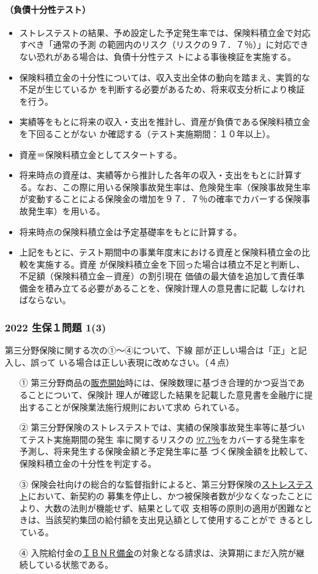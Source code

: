 \documentclass[report,gutter=10mm,fore-edge=10mm,uplatex,dvipdfmx]{jlreq}
\begin{document}
\paragraph{（負債十分性テスト）}
\begin{itemize}
 \item ストレステストの結果、予め設定した予定発生率では、保険料積立金で対応すべき「通常の予測
の範囲内のリスク（リスクの９７．７％）」に対応できない恐れがある場合は、負債十分性テス
トによる事後検証を実施する。
 \item 保険料積立金の十分性については、収入支出全体の動向を踏まえ、実質的な不足が生じているか
を判断する必要があるため、将来収支分析により検証を行う。
 \item 実績等をもとに将来の収入・支出を推計し、資産が負債である保険料積立金を下回ることがない
か確認する（テスト実施期間：１０年以上）。
 \item 資産＝保険料積立金としてスタートする。
 \item 将来時点の資産は、実績等から推計した各年の収入・支出をもとに計算する。なお、この際に用いる保険事故発生率は、危険発生率（保険事故発生率が変動することによる保険金の増加を９７．７％の確率でカバーする保険事故発生率）を用いる。
 \item 将来時点の保険料積立金は予定基礎率をもとに計算する。
 \item 上記をもとに、テスト期間中の事業年度末における資産と保険料積立金の比較を実施する。資産
が保険料積立金を下回った場合は積立不足と判断し、不足額（保険料積立金－資産）の割引現在
価値の最大値を追加して責任準備金を積み立てる必要があることを、保険計理人の意見書に記載
しなければならない。
\end{itemize}

\subsubsection{2022 生保１問題 1(3)}
第三分野保険に関する次の①～④について、下線
部が正しい場合は「正」と記入し、誤って
いる場合は正しい表現に改めなさい。（４点）
\begin{enumerate}
 \item [①] 第三分野商品の\underline{販売開始}時には、保険数理に基づき合理的かつ妥当であることについて、保険計
 理人が確認した結果を記載した意見書を金融庁に提出することが保険業法施行規則において求め
 られている。
 \item [②] 第三分野保険のストレステストでは、実績の保険事故発生率等に基づいてテスト実施期間の発生
 率に関するリスクの \underline{97.7％}をカバーする発生率を予測し、将来発生する保険金額と予定発生率に基
 づく保険金額を比較して、保険料積立金の十分性を判定する。
 \item [③] 保険会社向けの総合的な監督指針によると、第三分野保険の\underline{ストレステスト}において、新契約の
 募集を停止し、かつ被保険者数が少なくなったことにより、大数の法則が機能せず、結果として収
 支相等の原則の適用が困難なときは、当該契約集団の給付額を支出見込額として使用することがで
 きるとしている。
 \item [④] 入院給付金の\underline{ＩＢＮＲ備金}の対象となる請求は、決算期にまだ入院が継続している状態である。
\end{enumerate}
\end{document}
